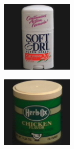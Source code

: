 \begin{figure}[tbp]
\begin{subfigure}{80pt}
    \caption{}
	\end{subfigure}
	\begin{subfigure}{80pt}
        \centering
    \includegraphics[width=\textwidth]{figures/coil_original/22.png}
    \caption{}
	\end{subfigure}
	\begin{subfigure}{80pt}
        \centering
    \includegraphics[width=\textwidth]{figures/coil_original/26.png}

\end{subfigure}
\end{figure}
